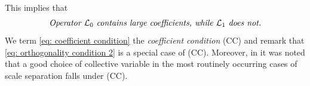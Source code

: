 \documentclass[reqno, 12pt]{article}
\newtheorem{remark}{Remark}
\begin{document}
This implies that 
\begin{equation}
\label{eq: coefficient condition}
    \centering \textit{Operator $\mathcal{L}_0$ contains large coefficients, while $\mathcal{L}_1$ does not.}
\end{equation}
We term \eqref{eq: coefficient condition} the \emph{coefficient condition} (CC) and remark that \eqref{eq: orthogonality condition 2} is a special case of (CC). Moreover, in  \parencite{lelievre2019pathwise} it was noted that a good choice of collective variable in the most routinely occurring cases of scale separation falls under (CC). 

\end{document}
